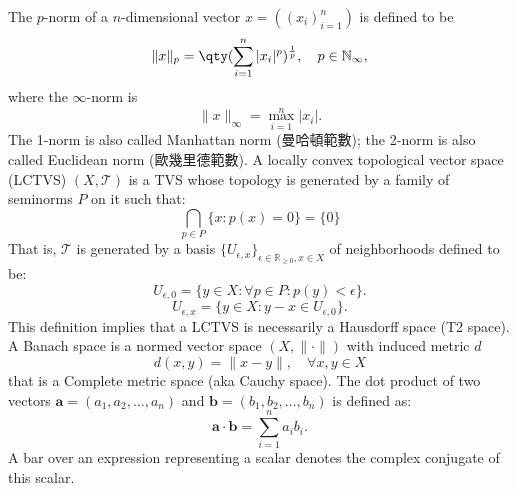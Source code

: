 \documentclass[a4paper,12pt]{article}
\begin{document}
The $p$-norm of a $n$-dimensional vector $x=((x_i)_{i=1}^n)$ is defined to be
\[\|x\|_p=\qty(\sum_{i=1}^n|x_i|^p)^{\frac{1}{p}},\quad p\in\mathbb{N}_{\infty},\]
where the $\infty$-norm is
\[\|x\|_{\infty}=\max_{i=1}^n|x_i|.\]
The 1-norm is also called Manhattan norm (曼哈頓範數); the 2-norm is also called Euclidean norm (歐幾里德範數).
A locally convex topological vector space (LCTVS) $(X,\mathcal{T})$ is a TVS whose topology is generated by a family of seminorms $P$ on it such that:
\[\bigcap_{p\in P}\{x\colon p(x)=0\}=\{0\}\]
That is, $\mathcal{T}$ is generated by a basis $\{U_{\epsilon,x}\}_{\epsilon\in\mathbb{R}_{\geq 0},x\in X}$ of neighborhoods defined to be:
\[U_{\epsilon,0}=\{y\in X\colon \forall p\in P\colon p(y)<\epsilon\}.\]
\[U_{\epsilon,x}=\{y\in X\colon y-x\in U_{\epsilon,0}\}.\]
This definition implies that a LCTVS is necessarily a Hausdorff space (T2 space).
A Banach space is a normed vector space $(X,\|{\cdot }\|)$ with induced metric $d$
\[d(x,y)=\|x-y\|,\quad \forall x,y\in X\]
that is a Complete metric space (aka Cauchy space).
The dot product of two vectors $\mathbf{a}=(a_1,a_2,\dots,a_n)$ and $\mathbf{b}=(b_1,b_2,\dots,b_n)$ is defined as:
\[\mathbf{a}\cdot\mathbf{b}=\sum_{i=1}^n a_ib_i.\]
A bar over an expression representing a scalar denotes the complex conjugate of this scalar.
\end{document}
